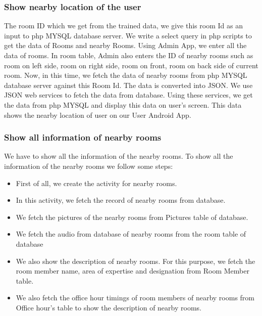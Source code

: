 \subsubsection{Show nearby location of the user}
The room ID which we get from the trained data, we give this room Id as an input to php MYSQL database server. We write a select query in php scripts to get the data of Rooms and nearby Rooms. 
Using Admin App, we enter all the data of rooms. In room table, Admin also enters the ID of nearby rooms such as room on left side, room on right side, room on front, room on back side of current room.  Now, in this time, we fetch the data of nearby rooms from php MYSQL database server against this Room Id. The data is converted into JSON. We use JSON web services to fetch the data from database. Using these services, we get the data from php MYSQL and display this data on user’s screen. This data shows the nearby location of user on our User Android App.
\subsubsection{Show all information of nearby rooms}
We have to show all the information of the nearby rooms. To show all the information of the nearby rooms we follow some steps:
\begin{itemize}
\item First of all, we create the activity for nearby rooms.
\item In this activity, we fetch the record of nearby rooms from database.
\item We fetch the pictures of the nearby rooms from Pictures table of database.
\item We fetch the audio from database of nearby rooms from the room table of database
\item We also show the description of nearby rooms. For this purpose, we fetch the room member name, area of expertise and designation from Room Member table.
\item We also fetch the office hour timings of room members of nearby rooms from Office hour’s table to show the description of nearby rooms.
\end{itemize}









